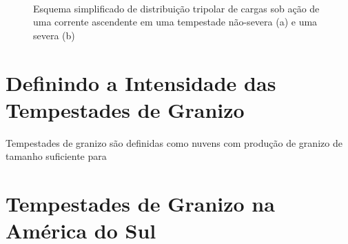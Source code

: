 \begin{figure}[hp]
	\begin{center}
		\caption{Esquema simplificado de distribuição tripolar de cargas sob ação de uma corrente ascendente em uma tempestade não-severa (a) e uma severa (b)} 
		\label{esquema_tripolar}
		 \\
	\end{center}
\end{figure}

\section{Definindo a Intensidade das Tempestades de Granizo}

Tempestades de granizo são definidas como nuvens com produção de granizo de tamanho suficiente para 

\section{Tempestades de Granizo na América do Sul}


